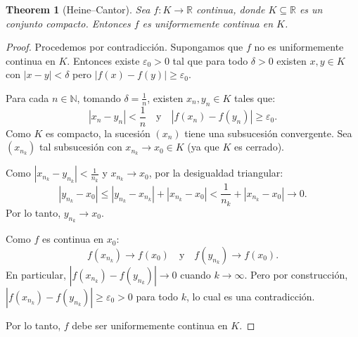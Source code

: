 \documentclass[11pt,a4paper]{article}
\theoremstyle{plain}
\newtheorem{theorem}{Theorem}[section]
\theoremstyle{definition}
\begin{document}
\begin{theorem}[Heine--Cantor]\label{thm:heine_cantor}
Sea $f: K \to \mathbb{R}$ continua, donde $K \subseteq \mathbb{R}$ es un conjunto compacto. Entonces $f$ es uniformemente continua en $K$.
\end{theorem}

\begin{proof}
Procedemos por contradicción. Supongamos que $f$ no es uniformemente continua en $K$. Entonces existe $\varepsilon_0 > 0$ tal que para todo $\delta > 0$ existen $x, y \in K$ con $|x - y| < \delta$ pero $|f(x) - f(y)| \geq \varepsilon_0$.

Para cada $n \in \mathbb{N}$, tomando $\delta = \frac{1}{n}$, existen $x_n, y_n \in K$ tales que:
\[
|x_n - y_n| < \frac{1}{n} \quad \text{y} \quad |f(x_n) - f(y_n)| \geq \varepsilon_0.
\]
Como $K$ es compacto, la sucesión $(x_n)$ tiene una subsucesión convergente. Sea $(x_{n_k})$ tal subsucesión con $x_{n_k} \to x_0 \in K$ (ya que $K$ es cerrado).

Como $|x_{n_k} - y_{n_k}| < \frac{1}{n_k}$ y $x_{n_k} \to x_0$, por la desigualdad triangular:
\[
|y_{n_k} - x_0| \leq |y_{n_k} - x_{n_k}| + |x_{n_k} - x_0| < \frac{1}{n_k} + |x_{n_k} - x_0| \to 0.
\]
Por lo tanto, $y_{n_k} \to x_0$.

Como $f$ es continua en $x_0$:
\[
f(x_{n_k}) \to f(x_0) \quad \text{y} \quad f(y_{n_k}) \to f(x_0).
\]
En particular, $|f(x_{n_k}) - f(y_{n_k})| \to 0$ cuando $k \to \infty$. Pero por construcción, $|f(x_{n_k}) - f(y_{n_k})| \geq \varepsilon_0 > 0$ para todo $k$, lo cual es una contradicción.

Por lo tanto, $f$ debe ser uniformemente continua en $K$.
\end{proof}
\end{document}
